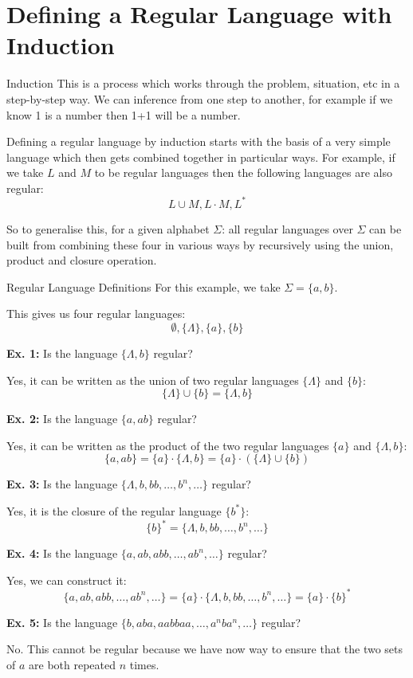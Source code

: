 \section{Defining a Regular Language with Induction}

\begin{define}
\item[Induction] This is a process which works through the problem, situation, etc in a step-by-step way. We can inference from one step to another, for example if we know 1 is a number then 1+1 will be a number.
\end{define}

Defining a regular language by induction starts with the basis of a very simple language which then gets combined together in particular ways. For example, if we take $L$ and $M$ to be regular languages then the following languages are also regular:
\[L \cup M, L \cdot M, L^*\]

So to generalise this, for a given alphabet $\Sigma$: all regular languages over $\Sigma$ can be built from combining these four in various ways by recursively using the union, product and closure operation. 

\begin{example}{Regular Language Definitions}
For this example, we take $\Sigma = \{a, b\}$. 

This gives us four regular languages:
\[\emptyset, \{\Lambda\}, \{a\}, \{b\}\]

\textbf{Ex. 1:} Is the language $\{\Lambda, b\}$ regular?

Yes, it can be written as the union of two regular languages $\{\Lambda\}$ and $\{b\}$:
\[\{\Lambda\} \cup \{b\} = \{\Lambda, b\}\]

\textbf{Ex. 2:} Is the language $\{a, ab\}$ regular?

Yes, it can be written as the product of the two regular languages $\{a\}$ and $\{\Lambda, b\}$:
\[\{a, ab\} = \{a\} \cdot \{\Lambda, b\} = \{a\} \cdot (\{\Lambda\} \cup \{b\})\]

\textbf{Ex. 3:} Is the language $\{\Lambda, b, bb, \ldots, b^n, \ldots\}$ regular?

Yes, it is the closure of the regular language $\{b^*\}$:
\[\{b\}^* = \{\Lambda, b, bb, \ldots, b^n, \ldots\}\]

\textbf{Ex. 4:} Is the language $\{a, ab, abb, \ldots, ab^n, \ldots\}$ regular?

Yes, we can construct it:
\[\{a, ab, abb, \ldots, ab^n, \ldots\} = \{a\} \cdot \{\Lambda, b, bb, \ldots, b^n, \ldots\} = \{a\} \cdot \{b\}^*\] 

\textbf{Ex. 5:} Is the language $\{b, aba, aabbaa, \ldots, a^nba^n, \ldots\}$ regular?

No. This cannot be regular because we have now way to ensure that the two sets of $a$ are both repeated $n$ times. 
\end{example}

